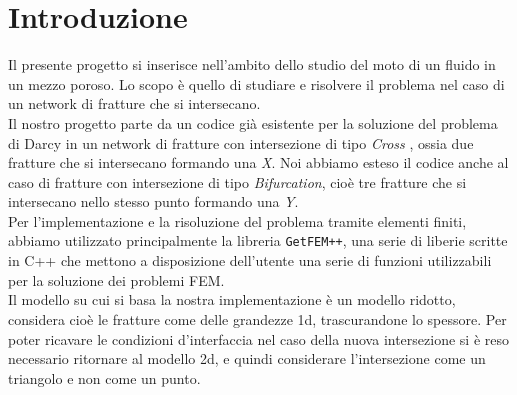 \chapter*{Introduzione}

Il presente progetto si inserisce nell'ambito dello studio del moto di un fluido in un mezzo poroso. Lo scopo è quello di studiare e risolvere il problema nel caso di un network di fratture che si intersecano. \\
Il nostro progetto parte da un codice già esistente per la soluzione del problema di Darcy in un network di fratture con intersezione di tipo \textit{Cross }, ossia due fratture che si intersecano formando una \textit{X}. Noi abbiamo esteso il codice anche al caso di fratture con intersezione di tipo \textit{Bifurcation}, cioè tre fratture che si intersecano nello stesso punto formando una \textit{Y}.\\
Per l'implementazione e la risoluzione del problema tramite elementi finiti, abbiamo utilizzato principalmente la libreria \texttt{GetFEM++}, una serie di liberie scritte in C++ che mettono a disposizione dell'utente una serie di funzioni utilizzabili per la soluzione dei problemi FEM. \\
Il modello su cui si basa la nostra implementazione è un modello ridotto, considera cioè le fratture come delle grandezze 1d, trascurandone lo spessore. Per poter ricavare le condizioni d'interfaccia nel caso della nuova intersezione si è reso necessario ritornare al modello 2d, e quindi considerare l'intersezione come un triangolo e non come un punto. 